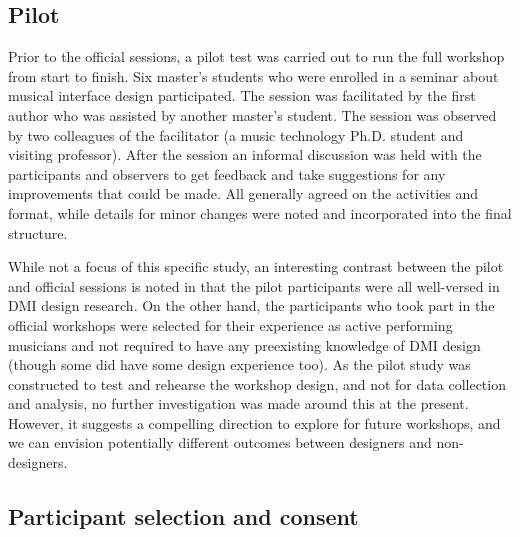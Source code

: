 \documentclass[letterpaper, 12pt]{article}
\begin{document}
\subsection{Pilot}
\label{ch3-sec:pilot}

Prior to the official sessions, a pilot test was carried out to run the full workshop from start to finish. Six master's students who were enrolled in a seminar about musical interface design participated. The session was facilitated by the first author who was assisted by another master's student.
The session was observed by two colleagues of the facilitator (a music technology Ph.D. student and visiting professor). After the session an informal discussion was held with the participants and observers to get feedback and take suggestions for any improvements that could be made. All generally agreed on the activities and format, while details for minor changes were noted and incorporated into the final structure.  

While not a focus of this specific study, an interesting contrast between the pilot and official sessions is noted in that the pilot participants were all well-versed in DMI design research. On the other hand, the participants who took part in the official workshops were selected for their experience as active performing musicians and not required to have any preexisting knowledge of DMI design (though some did have some design experience too). As the pilot study was constructed to test and rehearse the workshop design, and not for data collection and analysis, no further investigation was made around this at the present. However, it suggests a compelling direction to explore for future workshops, and we can envision potentially different outcomes between designers and non-designers. 

\subsection{Participant selection and consent}
\label{ch3-sec:participant-criteria-and-selection}

\end{document}
